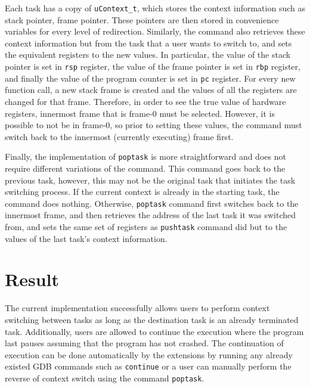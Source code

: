 Each task has a copy of \verb|uContext_t|, which stores the context
information such as stack pointer, frame pointer. These pointers are then stored
in convenience variables for every level of redirection. Similarly, the command
also retrieves these context information but from the task that a user wants to switch to, and
sets the equivalent registers to the new values. In particular, the value of the stack
pointer is set in \verb|rsp| register, the value of the frame pointer is set in \verb|rbp|
register, and finally the value of the program counter is set in \verb|pc| register.
For every new function call, a new stack frame is created and the values of all
the registers are changed for that frame. Therefore, in
order to see the true value of hardware registers, innermost frame that is
frame-0 must be selected\cite{reference11}. However, it is possible to not be in frame-0, so prior to setting these values,
the command must switch back to the innermost (currently executing) frame first.

Finally, the implementation of \verb|poptask| is more straightforward and does
not require different variations of the command. This command goes back to the previous task, however, this may not be the original
task that initiates the task switching process. If the current context is
already in the starting task, the command does nothing. Otherwise,
\verb|poptask| command first switches back to the innermost frame, and then
retrieves the
address of the last task it was switched from, and sets the same set of registers as
\verb|pushtask| command did but to the values of the last task's context
information.

\section{Result}
The current implementation successfully allows users to perform context
switching between tasks as long as the destination task is an already terminated
task. Additionally, users are allowed to continue the execution where the
program last pauses assuming that the program has not crashed. The continuation
of execution can be done automatically by the extensions by running any already
existed GDB commands such as \verb|continue| or a user can manually
perform the reverse of context switch using the command \verb|poptask|.
